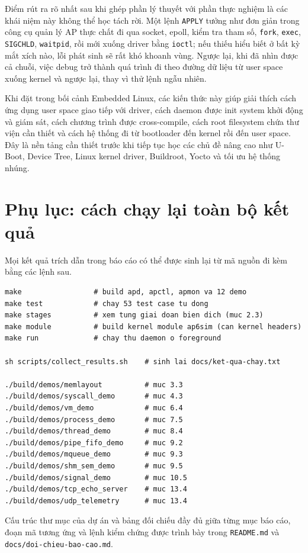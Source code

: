 \documentclass[11pt]{article}
\newcommand{\code}[1]{\texttt{#1}}
\begin{document}
Điểm rút ra rõ nhất sau khi ghép phần lý thuyết với phần thực nghiệm là các khái niệm này không thể học tách rời. Một lệnh \code{APPLY} tưởng như đơn giản trong công cụ quản lý AP thực chất đi qua socket, epoll, kiểm tra tham số, \code{fork}, \code{exec}, \code{SIGCHLD}, \code{waitpid}, rồi mới xuống driver bằng \code{ioctl}; nếu thiếu hiểu biết ở bất kỳ mắt xích nào, lỗi phát sinh sẽ rất khó khoanh vùng. Ngược lại, khi đã nhìn được cả chuỗi, việc debug trở thành quá trình đi theo đường dữ liệu từ user space xuống kernel và ngược lại, thay vì thử lệnh ngẫu nhiên.

Khi đặt trong bối cảnh Embedded Linux, các kiến thức này giúp giải thích cách ứng dụng user space giao tiếp với driver, cách daemon được init system khởi động và giám sát, cách chương trình được cross-compile, cách root filesystem chứa thư viện cần thiết và cách hệ thống đi từ bootloader đến kernel rồi đến user space. Đây là nền tảng cần thiết trước khi tiếp tục học các chủ đề nâng cao như U-Boot, Device Tree, Linux kernel driver, Buildroot, Yocto và tối ưu hệ thống nhúng.

\appendix
\section{Phụ lục: cách chạy lại toàn bộ kết quả}

Mọi kết quả trích dẫn trong báo cáo có thể được sinh lại từ mã nguồn đi kèm bằng các lệnh sau.

\begin{lstlisting}[caption={Các lệnh chính của dự án}]
make                 # build apd, apctl, apmon va 12 demo
make test            # chay 53 test case tu dong
make stages          # xem tung giai doan bien dich (muc 2.3)
make module          # build kernel module ap6sim (can kernel headers)
make run             # chay thu daemon o foreground

sh scripts/collect_results.sh    # sinh lai docs/ket-qua-chay.txt

./build/demos/memlayout          # muc 3.3
./build/demos/syscall_demo       # muc 4.3
./build/demos/vm_demo            # muc 6.4
./build/demos/process_demo       # muc 7.5
./build/demos/thread_demo        # muc 8.4
./build/demos/pipe_fifo_demo     # muc 9.2
./build/demos/mqueue_demo        # muc 9.3
./build/demos/shm_sem_demo       # muc 9.5
./build/demos/signal_demo        # muc 10.5
./build/demos/tcp_echo_server    # muc 13.4
./build/demos/udp_telemetry      # muc 13.4
\end{lstlisting}

Cấu trúc thư mục của dự án và bảng đối chiếu đầy đủ giữa từng mục báo cáo, đoạn mã tương ứng và lệnh kiểm chứng được trình bày trong \code{README.md} và \code{docs/doi-chieu-bao-cao.md}.
\end{document}
